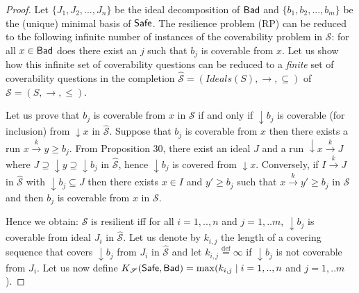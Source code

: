 \begin{proof}
Let $\{J_1, J_2,...,J_n\}$ be the ideal decomposition of $\textsf{Bad}$ and $\{b_1,b_2,...,b_m\}$ be the (unique) minimal basis of $\textsf{Safe}$.
The %
resilience problem (RP) can be reduced to the following infinite number of instances of the coverability problem in $\mathscr{S}$: for all $x \in \textsf{Bad}$ does there exist an $j$ such that $b_j$ is coverable from $x$. Let us show how this infinite set of coverability questions can be reduced to a \emph{finite} set of coverability questions in the completion $\hat{\mathscr{S}}=(Ideals(S),\rightarrow, \subseteq)$ of $\mathscr{S}=(S,\rightarrow, \leq)$. 


Let us prove that $b_j$ is coverable from $x$ in $\mathscr{S}$ if and only if $\downarrow b_j$ is coverable (for inclusion) from $\downarrow x$ in $\hat{\mathscr{S}}$.
%
Suppose that $b_j$ is coverable from $x$ then there exists a run $x \xrightarrow{k} y \geq b_j$. From Proposition 30, there exist an ideal $J$ and a run $\downarrow x \xrightarrow{k} J$ where $J \supseteq \downarrow y \supseteq \downarrow b_j$ in $\hat{\mathscr{S}}$, hence $\downarrow b_j$ is covered from $\downarrow x$.
Conversely, if $I \xrightarrow{k} J$ in $\hat{\mathscr{S}}$ with $\downarrow b_j \subseteq J$ then 
there exists $x \in I$ and $y' \geq b_j$ such that $x \xrightarrow{k} y'  \geq b_j$ in $\mathscr{S}$ and then $b_j$ is coverable from $x$ in $\mathscr{S}$.

Hence we obtain: $\mathscr{S}$ is resilient iff for all $i=1,..,n$ and $j= 1,..m$, $\downarrow b_j$ is coverable from ideal $J_i$ in $\hat{\mathscr{S}}$.
%
Let us denote by $k_{i,j}$ the length of a covering sequence that covers $\downarrow b_j$ from $J_i$ in $\hat{\mathscr{S}}$ and let $k_{i,j}\stackrel{\text{def}}{=}\infty$ if $\downarrow b_j$ is not coverable from $J_i$. Let us now define $K_{\mathscr{S}}(\textsf{Safe},\textsf{Bad})=\max(k_{i,j} \mid i=1,..,n$ and $j= 1,..m$).
%


\end{proof}
